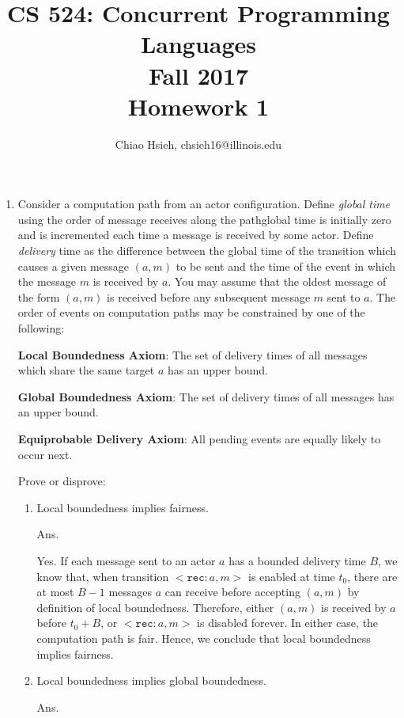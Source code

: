 \documentclass{article}
\title{\Large\bfseries
CS 524: Concurrent Programming Languages \\
Fall 2017 \\
Homework 1}
\author{Chiao Hsieh, chsieh16@illinois.edu}
\begin{document}
\maketitle

\begin{enumerate}
\item Consider a computation path from an actor configuration.
Define \textit{global time} using the order of message receives along the
path\textemdash global time is initially zero and is incremented each time a
message is received by some actor.
Define \textit{delivery} time as the difference between the global time of the
transition which causes a given message $(a, m)$ to be sent and the time of
the event in which the message $m$ is received by $a$.
You may assume that the oldest message of the form $(a, m)$ is received before
any subsequent message $m$ sent to $a$.
The order of events on computation paths may be constrained by one of the
following:

\textbf{Local Boundedness Axiom}:
The set of delivery times of all messages which share the same target $a$ has
an upper bound.

\textbf{Global Boundedness Axiom}:
The set of delivery times of all messages has an upper bound.

\textbf{Equiprobable Delivery Axiom}:
All pending events are equally likely to occur next.

Prove or disprove:
\begin{enumerate}
\item Local boundedness implies fairness.

Ans.

Yes. If each message sent to an actor $a$ has a bounded delivery time $B$, we 
know that, when transition $<\texttt{rec}: a, m>$ is enabled at time $t_0$, 
there are at most $B-1$ messages $a$ can receive before accepting $(a,m)$ by 
definition of local boundedness. Therefore, either $(a,m)$ is received by $a$ 
before $t_0+B$, or $<\texttt{rec}: a, m>$ is disabled forever. In either 
case, the computation path is fair. Hence, we conclude that local boundedness 
implies fairness.

\item Local boundedness implies global boundedness.

Ans.


\end{enumerate}
\end{enumerate}
\end{document}
